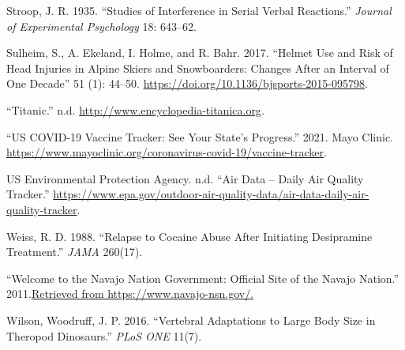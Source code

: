 \documentclass[
]{report}
\newlength{\cslhangindent}
\newlength{\cslentryspacingunit} %
\newenvironment{CSLReferences}[2] %
 {%
  \setlength{\parindent}{0pt}
  \ifodd #1
  \let\oldpar\par
  \def\par{\hangindent=\cslhangindent\oldpar}
  \fi
  \setlength{\parskip}{#2\cslentryspacingunit}
 }%
 {}
\begin{document}
\begin{CSLReferences}{1}{0}
\leavevmode{}%
Stroop, J. R. 1935. {``Studies of Interference in Serial Verbal Reactions.''} \emph{Journal of Experimental Psychology} 18: 643--62.

\leavevmode{}%
Sulheim, S., A. Ekeland, I. Holme, and R. Bahr. 2017. {``Helmet Use and Risk of Head Injuries in Alpine Skiers and Snowboarders: Changes After an Interval of One Decade''} 51 (1): 44--50. \url{https://doi.org/10.1136/bjsports-2015-095798}.

\leavevmode{}%
{``Titanic.''} n.d. \url{http://www.encyclopedia-titanica.org}.

\leavevmode{}%
{``US COVID-19 Vaccine Tracker: See Your State's Progress.''} 2021. Mayo Clinic. \url{https://www.mayoclinic.org/coronavirus-covid-19/vaccine-tracker}.

\leavevmode{}%
US Environmental Protection Agency. n.d. {``Air Data -- Daily Air Quality Tracker.''} \url{https://www.epa.gov/outdoor-air-quality-data/air-data-daily-air-quality-tracker}.

\leavevmode{}%
Weiss, R. D. 1988. {``Relapse to Cocaine Abuse After Initiating Desipramine Treatment.''} \emph{JAMA} 260(17).

\leavevmode{}%
{``Welcome to the Navajo Nation Government: Official Site of the Navajo Nation.''} 2011.\href{\%20Retrieved\%20from\%20https://www.navajo-nsn.gov/.}{Retrieved from https://www.navajo-nsn.gov/.}

\leavevmode{}%
Wilson, Woodruff, J. P. 2016. {``Vertebral Adaptations to Large Body Size in Theropod Dinosaurs.''} \emph{PLoS ONE} 11(7).

\end{CSLReferences}
\end{document}
